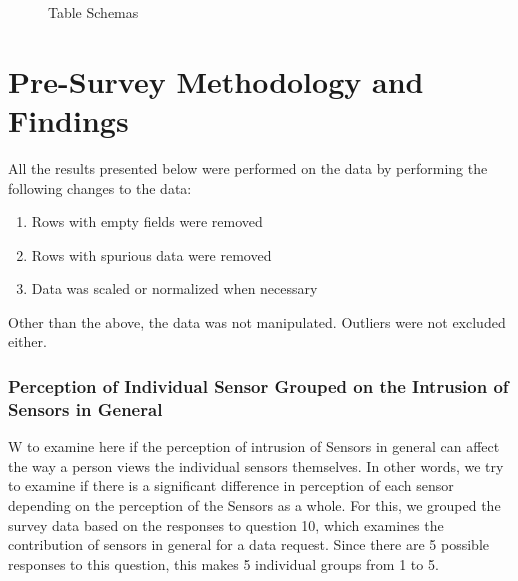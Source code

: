 \begin{figure}[htp]
\hspace{1em}
\caption{Table Schemas}
\label{fig:s3}
\end{figure}


\section{Pre-Survey Methodology and Findings}
All the results presented below were performed on the data by performing the following changes to the data:
\begin{enumerate}
\item Rows with empty fields were removed
\item Rows with spurious data were removed
\item Data was scaled or normalized when necessary
\end{enumerate}

Other than the above, the data was not manipulated. Outliers were not excluded either.

\subsubsection{Perception of Individual Sensor Grouped on the Intrusion of Sensors in General} \label{result:sensor}
W to examine here if the perception of intrusion of Sensors in general can affect the way a person views the individual sensors themselves. In other
words, we try to examine if there is a significant difference in perception of each sensor depending on the perception of the Sensors as a whole.
For this, we grouped the survey data based on the responses to question 10, which examines the contribution of sensors in general for a data request. Since there are 5 possible responses to this question, this makes 5 individual groups from 1 to 5.

